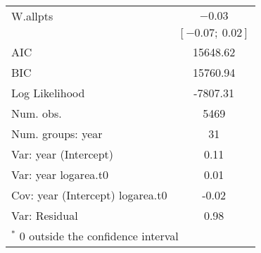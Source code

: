 \documentclass[11pt]{article}
\begin{document}
\begin{table}
\begin{center}
\begin{tabular}{l c }
W.allpts                         & $-0.03$           \\
                                 & $[-0.07;\ 0.02]$  \\
\hline
AIC                              & 15648.62          \\
BIC                              & 15760.94          \\
Log Likelihood                   & -7807.31          \\
Num. obs.                        & 5469              \\
Num. groups: year                & 31                \\
Var: year (Intercept)            & 0.11              \\
Var: year logarea.t0             & 0.01              \\
Cov: year (Intercept) logarea.t0 & -0.02             \\
Var: Residual                    & 0.98              \\
\hline
\multicolumn{2}{l}{\scriptsize{$^*$ 0 outside the confidence interval}}
\end{tabular}
\label{table:POSEgrowth-byYr}
\end{center}
\end{table}
\end{document}
